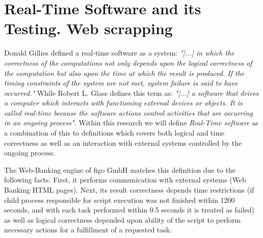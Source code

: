 \chapter{Real-Time Software and its Testing. Web scrapping}
Donald Gillies defined a real-time software as a system: \textit{"[...] in which the correctness of the computations not only depends upon the logical correctness of the computation but also upon the time at which the result is produced. If the timing constraints of the system are not met, system failure is said to have occurred."} While Robert L. Glass\cite{RealTimeTesting} defines this term as: \textit{"[...] a software that drives a computer which interacts with functioning external devices or objects. It is called real-time because the software actions control activities that are occurring in an ongoing process".} Within this research we will define  \textit{Real-Time software} as a combination of this to definitions which covers both logical and time correctness as well as an interaction with external systems controlled by the ongoing process.

The Web-Banking engine of figo GmbH matches this definition due to the following facts. First, it performs communication with external systems (Web Banking HTML pages). Next, its result correctness depends time restrictions (if child process responsible for script execution was not finished within 1200 seconds, and with each task performed within 0.5 seconds it is treated as failed) as well as logical correctness depended upon ability of the script to perform necessary actions for a fulfillment of a requested task.





